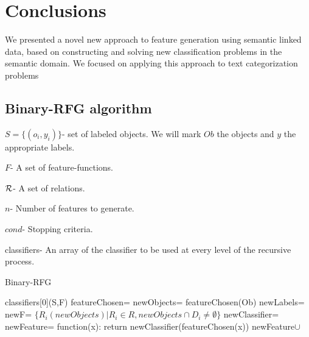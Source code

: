 \documentclass{article}
\theoremstyle{definition}
\begin{document}

\section{Conclusions}
We presented a novel new approach to feature generation using semantic linked data, based on constructing and solving new classification problems in the semantic domain. We focused on applying this approach to text categorization problems

\begin{appendices}
	\section{Binary-RFG algorithm} \label{app:2}
	\begin{algorithm}[H]
		$S=\{(o_{i},y_{i})\}$- set of labeled objects. We will mark $Ob$ the objects and $y$ the appropriate labels.
		
		$F$- A set of feature-functions.
		
		$\cal R$- A set of relations.
		
		$n$- Number of features to generate.
		
		$cond$- Stopping criteria.
		
		classifiers- An array of the classifier to be used at every level of the recursive process.
		
		\caption{Binary-RFG}
		\label{code2}
		\begin{algorithmic}
			\State
			\Return classifiers[0](S,F)
			\EndIf
			\State featureChosen= 
			\State newObjects= featureChosen(Ob)
			\State newLabels= 
			\State newF= $\{R_{i}(newObjects)|R_{i}\in R, newObjects\cap D_{i}\neq\emptyset\}$
			\State newClassifier= 
			\State newFeature= function(x): return newClassifier(featureChosen(x))
			\State
			\Return newFeature$\cup$ 
			\EndFunction
			
		\end{algorithmic}
	\end{algorithm}
	
\end{appendices}

\pagebreak


\end{document}
